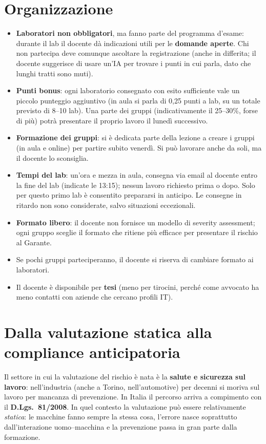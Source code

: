 \section{Organizzazione}
\begin{itemize}
  \item \textbf{Laboratori non obbligatori}, ma fanno parte del programma d'esame: durante il lab il
    docente dà indicazioni utili per le \textbf{domande aperte}. Chi non partecipa deve comunque
    ascoltare la registrazione (anche in differita; il docente suggerisce di usare un'IA per trovare
    i punti in cui parla, dato che lunghi tratti sono muti).
  \item \textbf{Punti bonus}: ogni laboratorio consegnato con esito sufficiente vale un piccolo
    punteggio aggiuntivo (in aula si parla di 0,25 punti a lab, su un totale previsto di 8--10 lab).
    Una parte dei gruppi (indicativamente il 25--30\%, forse di più) potrà presentare il proprio
    lavoro il lunedì successivo.
  \item \textbf{Formazione dei gruppi}: si è dedicata parte della lezione a creare i gruppi (in aula
    e online) per partire subito venerdì. Si può lavorare anche da soli, ma il docente lo sconsiglia.
  \item \textbf{Tempi del lab}: un'ora e mezza in aula, consegna via email al docente entro la fine
    del lab (indicate le 13:15); nessun lavoro richiesto prima o dopo. Solo per questo primo lab è
    consentito prepararsi in anticipo. Le consegne in ritardo non sono considerate, salvo situazioni
    eccezionali.
  \item \textbf{Formato libero}: il docente non fornisce un modello di severity assessment; ogni
    gruppo sceglie il formato che ritiene più efficace per presentare il rischio al Garante.
  \item Se pochi gruppi parteciperanno, il docente si riserva di cambiare formato ai laboratori.
  \item Il docente è disponibile per \textbf{tesi} (meno per tirocini, perché come avvocato ha meno
    contatti con aziende che cercano profili IT).
\end{itemize}

\section{Dalla valutazione statica alla compliance anticipatoria}

Il settore in cui la valutazione del rischio è nata è la \textbf{salute e sicurezza sul lavoro}:
nell'industria (anche a Torino, nell'automotive) per decenni si moriva sul lavoro per mancanza di
prevenzione. In Italia il percorso arriva a compimento con il \textbf{D.Lgs.~81/2008}. In quel
contesto la valutazione può essere relativamente \emph{statica}: le macchine fanno sempre la stessa
cosa, l'errore nasce soprattutto dall'interazione uomo--macchina e la prevenzione passa in gran parte
dalla formazione.

